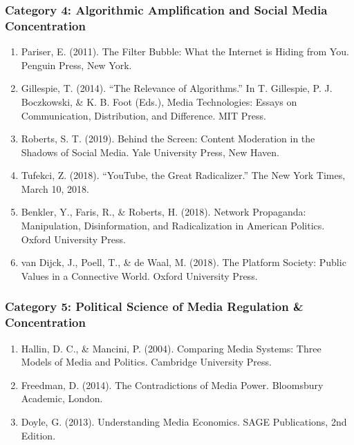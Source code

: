 {\subsubsection*{Category 4: Algorithmic Amplification and Social Media Concentration}

\begin{enumerate}
\item Pariser, E. (2011). The Filter Bubble: What the Internet is Hiding from You. Penguin Press, New York.

\item Gillespie, T. (2014). ``The Relevance of Algorithms.'' In T. Gillespie, P. J. Boczkowski, \&
  K. B. Foot (Eds.), Media Technologies: Essays on Communication, Distribution, and Difference. MIT Press.

\item Roberts, S. T. (2019). Behind the Screen: Content Moderation in the Shadows of Social Media.
  Yale University Press, New Haven.

\item Tufekci, Z. (2018). ``YouTube, the Great Radicalizer.'' The New York Times, March 10, 2018.

\item Benkler, Y., Faris, R., \& Roberts, H. (2018). Network Propaganda: Manipulation, Disinformation,
  and Radicalization in American Politics. Oxford University Press.

\item van Dijck, J., Poell, T., \& de Waal, M. (2018). The Platform Society: Public Values in a
  Connective World. Oxford University Press.
\end{enumerate}

\subsubsection*{Category 5: Political Science of Media Regulation \& Concentration}

\begin{enumerate}
\item Hallin, D. C., \& Mancini, P. (2004). Comparing Media Systems: Three Models of Media and Politics.
  Cambridge University Press.

\item Freedman, D. (2014). The Contradictions of Media Power. Bloomsbury Academic, London.

\item Doyle, G. (2013). Understanding Media Economics. SAGE Publications, 2nd Edition.


\end{enumerate}}
